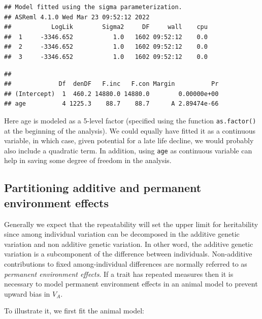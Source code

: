 \documentclass[
  12pt,
]{book}
\begin{document}
\begin{verbatim}
## Model fitted using the sigma parameterization.
## ASReml 4.1.0 Wed Mar 23 09:52:12 2022
##           LogLik        Sigma2     DF     wall    cpu
##  1     -3346.652           1.0   1602 09:52:12    0.0
##  2     -3346.652           1.0   1602 09:52:12    0.0
##  3     -3346.652           1.0   1602 09:52:12    0.0
\end{verbatim}

\begin{verbatim}
## 
##             Df  denDF   F.inc   F.con Margin          Pr
## (Intercept)  1  460.2 14880.0 14880.0        0.00000e+00
## age          4 1225.3    88.7    88.7      A 2.89474e-66
\end{verbatim}

Here age is modeled as a 5-level factor (specified using the function \texttt{as.factor()} at the beginning of the analysis). We could equally have fitted it as a continuous variable, in which case, given potential for a late life decline, we would probably also include a quadratic term.
In addition, using \texttt{age} as continuous variable can help in saving some degree of freedom in the analysis.

\hypertarget{partitioning-additive-and-permanent-environment-effects}{%
\subsection{Partitioning additive and permanent environment effects}\label{partitioning-additive-and-permanent-environment-effects}}

Generally we expect that the repeatability will set the upper limit for heritability since among individual variation can be decomposed in the additive genetic variation and non additive genetic variation. In other word, the additive genetic variation is a subcomponent of the difference between individuals.
Non-additive contributions to fixed among-individual differences are normally referred to as \emph{permanent environment effects}. If a trait has repeated measures then it is necessary to model permanent environment effects in an animal model to prevent upward bias in \(V_A\).

To illustrate it, we first fit the animal model:
\end{document}
